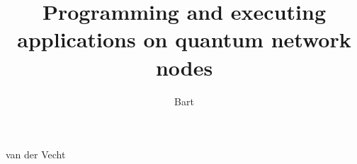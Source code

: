 \documentclass[
]{dissertation}
\theoremstyle{definition}
\begin{document}
% 

\title{Programming and executing applications on quantum network nodes}
\author{Bart}{van der Vecht}

\frontmatter




\tableofcontents

\graphicspath{{figures/}{chapters/main/qnodeos/main/}}


% 



\mainmatter

\thumbtrue


\newif\iffullchapters
\fullchapterstrue

% 
% 
% 
% 

% 
% 

\appendix

% 

\thumbfalse

\glsaddall
\printnoidxglossary[type=\acronymtype,title={Glossary}]

% 
\end{document}
